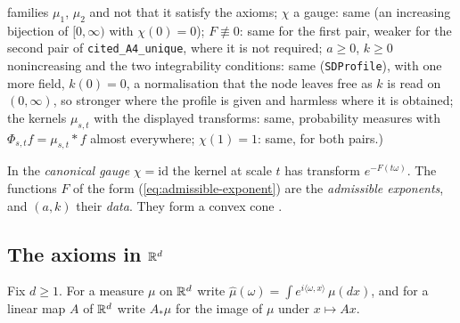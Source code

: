 \begin{theorem}
{families $\mu_1$, $\mu_2$ and not that it satisfy the axioms; $\chi$ a gauge: same (an increasing
bijection of $[0,\infty)$ with $\chi(0) = 0$); $F \not\equiv 0$: same for the first pair, weaker for
the second pair of \texttt{cited\_A4\_unique}, where it is not required; $a \ge 0$, $k \ge 0$
nonincreasing and the two integrability conditions: same (\texttt{SDProfile}), with one more field,
$k(0) = 0$, a normalisation that the node leaves free as $k$ is read on $(0,\infty)$, so stronger
where the profile is given and harmless where it is obtained; the kernels $\mu_{s,t}$ with the
displayed transforms: same, probability measures with $\Phi_{s,t}f = \mu_{s,t} * f$ almost
everywhere; $\chi(1) = 1$: same, for both pairs.)}
\end{theorem}

In the \emph{canonical gauge} $\chi = \mathrm{id}$ the kernel at scale $t$ has transform
$e^{-F(t\omega)}$. The functions $F$ of the form (\ref{eq:admissible-exponent}) are the
\emph{admissible exponents}, and $(a, k)$ their \emph{data}. They form a convex cone
.

\subsection{The axioms in $\mathbb{R}^d$}
\label{subsec:cited-d}

Fix $d \ge 1$. For a measure $\mu$ on $\mathbb{R}^d$ write
$\widehat\mu(\omega) = \int e^{i\langle\omega, x\rangle}\,\mu(dx)$, and for a linear map $A$ of
$\mathbb{R}^d$ write $A_*\mu$ for the image of $\mu$ under $x \mapsto Ax$.

